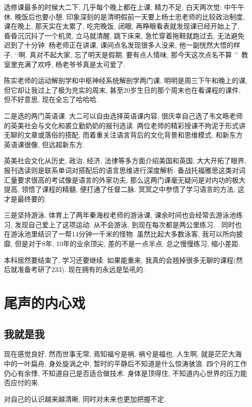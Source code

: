 \documentclass[a4paper, UTF8,  12pt]{article}
\begin{document}
选修课最多的时候大二下, 几乎每个晚上都在上课, 精力不足, 白天两次觉: 中午午休, 晚饭后也要小憩. 印象深刻的是清明假前一天要上杨士忠老师的比较政治制度, 课在晚上, 那天实在太累了, 吃完晚饭, 闭眼, 再睁眼看表就发现课已经开始上了, 昏昏沉沉抖了一个机灵, 立马就清醒, 跳下床来, 急忙穿着拖鞋就跑过去, 无法避免迟到了十分钟. 杨老师正在讲课, 课间点名发现很多人没来, 他一副恍然大悟的样子, \lq\lq 啊, 真对不起大家, 忘了明天是假期, 要有点人情味, 那今天这次点名不算 \rq\rq\ 教室里充满了欢呼, 杨老爷爷真是太可爱了. 

陈实老师的运动解剖学和中枢神经系统解剖学两门课, 明明是周三下午和晚上的课, 但它却让我过上了极为充实的周末, 甚至20岁生日的那个周末也在看课程的课件, 但不好意思, 现在全忘了哈哈哈.

二是选的两门英语课. 大二可以自由选择英语课内容, 很庆幸自己选了韦文晧老师的英美社会与文化和裘立勤奶奶的报刊选读. 两位老师的精彩授课不拘泥于形式讲无聊的文章或落俗的搭配, 而着重关注语言背后的文化背景和思维模式, 和新东方英语课很像, 但远超新东方. 

英美社会文化从历史, 政治, 经济, 法律等多方面介绍美国和英国, 大大开拓了眼界, 报刊选读则是联系单词对搭配后的语言思维进行深度解析. 备战托福雅思这类对词汇量要求很高的考试像是语言的外家功夫, 那么这两门课毫无疑问是对内功的极大提高, 领悟了课程的精髓, 便打通了任督二脉. 冥冥之中参悟了学习语言的方法, 这才是最终要的.

三是坚持游泳. 体育上了两年秦海权老师的游泳课, 课余时间也会经常去游泳池练习, 发现自己爱上了这项运动. 从不会游泳, 到现在每次都是两公里练习, . 同时也在游泳池里结识了一帮14分钟一千米的怪物. 虽然比起大多数泳客, 我可以所向披靡, 但是对于8年, 10年的业余顶尖, 差的不是一点半点. 总之慢慢练习, 缩小差距.

本科居然要结束了, 学习还要继续. 如果能重来, 我真的会翘掉很多无聊的课程(然后就准备考研了233). 现在拥有的永远是坠吼的.

\newpage
\section{尾声的内心戏}
\subsection{我就是我}

现在感觉良好, 然而世事无常, 焉知福兮是祸, 祸兮是福也. 人生啊, 就是茫茫大海中的一叶扁舟, 身处旋涡之中, 暂时的平静后不知道是什么惊涛骇浪. 四个月的工作仍心有余悸, 不知道自己是否适合做技术. 身体是顶得住, 不知道内心世界的压力能否应付的来. 

对自己的认识越来越清晰, 同时对未来也更加把握不定.
\end{document}
